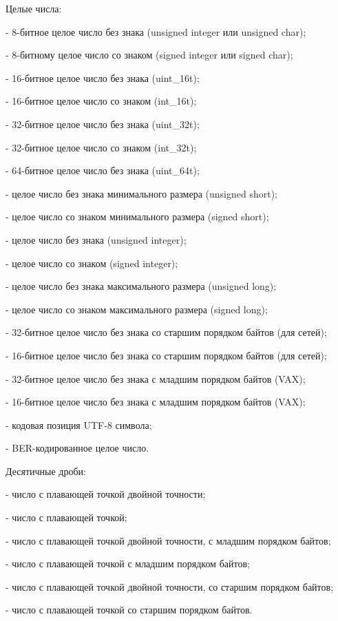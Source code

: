 \begin{keylist}{Целые числа:}
  
   - 8-битное целое число без знака (unsigned integer или unsigned char); 
  
   - 8-битному целое число со знаком (signed integer или signed char); 
  
   - 16-битное целое число без знака (uint_16t); 
  
   - 16-битное целое число со знаком (int_16t); 
  
   - 32-битное целое число без знака (uint_32t); 
  
   - 32-битное целое число со знаком (int_32t); 
  
   - 64-битное целое число без знака (uint_64t); 
  
   - целое число без знака минимального размера (unsigned short);
  
   - целое число со знаком минимального размера (signed short);
  
   - целое число без знака (unsigned integer);
  
   - целое число со знаком (signed integer);
  
   - целое число без знака максимального размера (unsigned long);
  
   - целое число со знаком максимального размера (signed long);
  
   - 32-битное целое число без знака со старшим порядком байтов (для сетей);
  
   - 16-битное целое число без знака со старшим порядком байтов (для сетей);
  
   - 32-битное целое число без знака с младшим порядком байтов (VAX);
  
   - 16-битное целое число без знака с младшим порядком байтов (VAX);
  
   - кодовая позиция UTF-8 символа;
  
   - BER-кодированное целое число.
\end{keylist}

\begin{keylist}{Десятичные дроби:}
  
   - число с плавающей точкой двойной точности; 
  
   - число с плавающей точкой; 
  
   - число с плавающей точкой двойной точности, с младшим порядком байтов; 
  
   - число с плавающей точкой с младшим порядком байтов; 
  
   - число с плавающей точкой двойной точности, со старшим порядком байтов; 
  
   - число с плавающей точкой со старшим порядком байтов. 
\end{keylist}

